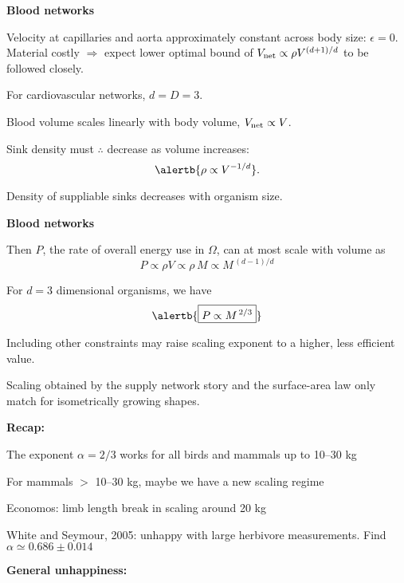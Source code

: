   \textbf{Blood networks}

  
   Velocity at capillaries and 
    aorta approximately constant across body size\cite{weinberg2006a}: 
    $\epsilon = 0$.
   \alert{Material costly} $\Rightarrow$ expect lower optimal bound of 
    $V_{\textnormal{net}} \propto \rho V^{(d+1)/d}$ to be followed closely.
  
    For cardiovascular networks, \alert{$d=D=3$}.
  
    Blood volume scales linearly with body
    volume\cite{stahl1967a}, $V_{\textnormal{net}} \propto V$.
  
    Sink density must $\therefore$ decrease as volume increases:
    $$
    \alertb{\rho \propto V^{-1/d}}.
    $$
  
    Density of suppliable sinks \alert{decreases} with organism size.
        



  \textbf{Blood networks}

  
   Then $P$, the rate of overall energy 
    use in $\Omega$, can at most scale with volume as
    $$
    P \propto \rho V 
    {
      \propto \rho \, M
    }
    {
      \propto M^{\, (d-1)/d}
    }
    $$
   
    For $d=3$ dimensional organisms, we have 
    $$\alertb{\boxed{ P \propto M^{\, 2/3}}}$$
   
    Including other constraints may raise scaling exponent
    to a higher, less efficient value.
  
    Scaling obtained by the supply network story and the surface-area law
    \alert{only match} for isometrically growing shapes.\\
      


  \textbf{Recap:}

  
  
   
    The exponent $\alpha = 2/3$ works for all birds and
    mammals up to 10--30 kg
   
    For mammals $>$ 10--30 kg, maybe we have a new scaling regime
   
    Economos: limb length break in scaling around 20 kg
   
    White and Seymour, 2005: unhappy with large herbivore measurements.
    Find $\alpha \simeq 0.686 \pm 0.014$
  
  


  \textbf{General unhappiness:}

